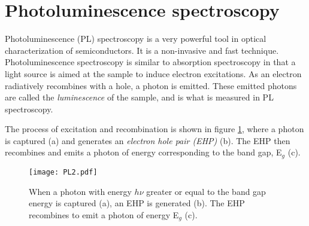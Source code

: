 			
			
		

	
\section{Photoluminescence spectroscopy}
\label{sec:pl}
Photoluminescence (PL) spectroscopy is a very powerful tool in optical characterization of semiconductors. It is a non-invasive and fast technique. Photoluminescence spectroscopy is similar to absorption spectroscopy in that a light source is aimed at the sample to induce electron excitations. As an electron radiatively recombines with a hole, a photon is emitted. These emitted photons are called the \emph{luminescence} of the sample, and is what is measured in PL spectroscopy. 




The process of excitation and recombination is shown in figure \ref{fig:pl2}, where a photon is captured (a) and generates an \emph{electron hole pair (EHP)} (b). The EHP then recombines and emits a photon of energy corresponding to the band gap, E$_g$ (c). 

\begin{figure}[h]
\begin{center}
\texttt{[image: PL2.pdf]}
\caption{When a photon with energy $h\nu$ greater or equal to the band gap energy is captured (a), an EHP is generated (b). The EHP recombines to emit a photon of energy E$_g$ (c).
\label{fig:pl2}}
\end{center}
\end{figure}

